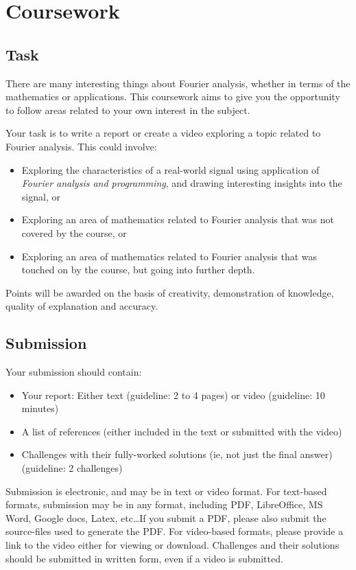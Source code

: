 \newpage
\section{Coursework}
\subsection{Task}
There are many interesting things about Fourier analysis, whether in terms of the mathematics or applications.
This coursework aims to give you the opportunity to follow areas related to your own interest in the subject.

Your task is to write a report or create a video exploring a topic related to Fourier analysis. This could involve:
\begin{itemize}
    \item Exploring the characteristics of a real-world signal using application of \emph{Fourier analysis and programming}, and drawing interesting insights into the signal, or
    \item Exploring an area of mathematics related to Fourier analysis that was not covered by the course, or
    \item Exploring an area of mathematics related to Fourier analysis that was touched on by the course, but going into further depth.
\end{itemize}


Points will be awarded on the basis of creativity, demonstration of knowledge, quality of explanation and accuracy.

\subsection{Submission}
Your submission should contain:
\begin{itemize}
    \item Your report: Either text (guideline: 2 to 4 pages) or video (guideline: 10 minutes)
    \item A list of references (either included in the text or submitted with the video)
    \item Challenges with their fully-worked solutions (ie, not just the final answer) (guideline: 2 challenges)
\end{itemize}

Submission is electronic, and may be in text or video format. For text-based formats, submission may be in any format, including PDF, LibreOffice, MS Word, Google docs, Latex, etc\ldots If you submit a PDF, please also submit the source-files used to generate the PDF. For video-based formats, please provide a link to the video either for viewing or download. Challenges and their solutions should be submitted in written form, even if a video is submitted.

